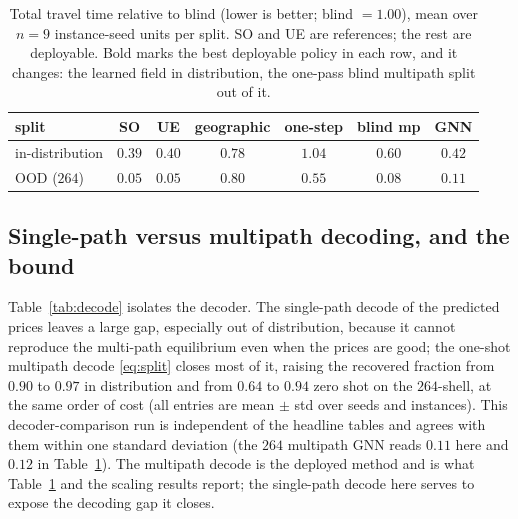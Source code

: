 \documentclass[journal]{IEEEtran}
\begin{document}
\begin{table}[t]
\centering
\caption{Total travel time relative to blind (lower is better; blind $=1.00$), mean over $n{=}9$ instance-seed units per split. SO and UE are references; the rest are deployable. Bold marks the best deployable policy in each row, and it changes: the learned field in distribution, the one-pass blind multipath split out of it.}
\label{tab:baselines}
\setlength{\tabcolsep}{3pt}\footnotesize
\begin{tabular}{lcccccc}
\toprule
split & SO & UE & geographic & one-step & blind mp & \textbf{GNN} \\
\midrule
in-distribution & $0.39$ & $0.40$ & $0.78$ & $1.04$ & $0.60$ & $\mathbf{0.42}$ \\
OOD ($264$) & $0.05$ & $0.05$ & $0.80$ & $0.55$ & $\mathbf{0.08}$ & $0.11$ \\
\bottomrule
\end{tabular}
\end{table}

\subsection{Single-path versus multipath decoding, and the bound}\label{sec:results-decode}
Table~\ref{tab:decode} isolates the decoder. The single-path decode of the predicted
prices leaves a large gap, especially out of distribution, because it cannot reproduce
the multi-path equilibrium even when the prices are good; the one-shot multipath decode
\eqref{eq:split} closes most of it, raising the recovered fraction from $0.90$ to $0.97$ in
distribution and from $0.64$ to $0.94$ zero shot on the $264$-shell, at the same order of cost
(all entries are mean $\pm$ std over seeds and instances). This decoder-comparison run is
independent of the headline tables and agrees with them within one standard deviation
(the $264$ multipath GNN reads $0.11$ here and $0.12$ in Table~\ref{tab:baselines}). The
multipath decode is the deployed method and is what Table~\ref{tab:baselines} and the
scaling results report; the single-path decode here serves to expose the decoding gap it
closes.
\end{document}
